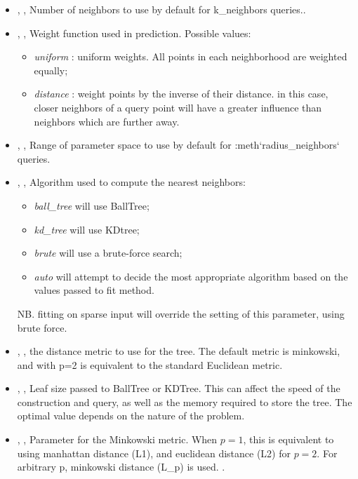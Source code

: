\begin{itemize}
  \item {} , ,
  Number of neighbors to use by default for k\_neighbors queries..
  \item {} , ,
  Weight function used in prediction.
  Possible values:
\begin{itemize}
    \item \textit{uniform} : uniform weights.
    All points in each neighborhood are weighted equally;
    \item \textit{distance} : weight points by the inverse of their distance.
    in this case, closer neighbors of a query point will have a greater
    influence than neighbors which are further away.
\end{itemize}

  \item {} , ,
  Range of parameter space to use by default for :meth`radius\_neighbors`
  queries.
  \item {} , ,
  Algorithm used to compute the nearest neighbors:
\begin{itemize}
    \item \textit{ball\_tree} will use BallTree;
    \item \textit{kd\_tree} will use KDtree;
    \item \textit{brute} will use a brute-force search;
    \item \textit{auto} will attempt to decide the most appropriate algorithm
    based on the values passed to fit method.
\end{itemize}
  NB.
  fitting on sparse input will override the setting of this parameter, using
  brute force.
  \item {} , ,
  the distance metric to use for the tree.
  The default metric is minkowski, and with p=2 is equivalent to the standard
  Euclidean metric.
  \item {} , ,
  Leaf size passed to BallTree or KDTree.
  This can affect the speed of the construction and query, as well as the memory
  required to store the tree.
  The optimal value depends on the nature of the problem.
  \item {} , ,
  Parameter for the Minkowski metric.
  When $p = 1$, this is equivalent to using manhattan distance (L1), and
  euclidean distance (L2) for $p = 2$.
  For arbitrary p, minkowski distance (L\_p) is used.
  .
\end{itemize}
